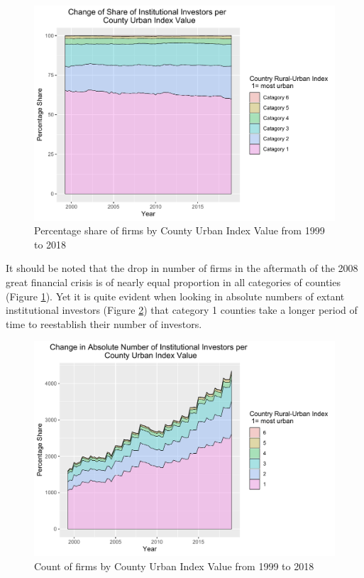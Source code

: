 \begin{figure}[h]
	\centering
	\includegraphics[width=1\linewidth]{Figures/ChapterIII/ChangeInRelativeNumberRuralUrban}
	\caption[Relative Numbers of Institutional Investors Over Time by County Urban-Rural Index]{Percentage share of firms by County Urban Index Value from 1999 to 2018}
	\label{fig:changeinrelativenumberruralurban}
\end{figure}

It should be noted that the drop in number of firms in the aftermath of the 2008 great financial crisis is of nearly equal proportion in all categories of counties (Figure \ref{fig:changeinrelativenumberruralurban}).  Yet it is quite evident when looking in absolute numbers of extant institutional investors (Figure \ref{fig:changeinabsolutenumberruralurban}) that category 1 counties take a longer period of time to reestablish their number of investors.  

\begin{figure}[h]
	\centering
	\includegraphics[width=1\linewidth]{Figures/ChapterIII/ChangeInAbsoluteNumberRuralUrban}
	\caption[Absolute Numbers of Institutional Investors Over Time by County Urban-Rural Index]{Count of firms by County Urban Index Value from 1999 to 2018}
	\label{fig:changeinabsolutenumberruralurban}
\end{figure}

